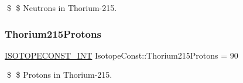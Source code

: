\$ \$ Neutrons in Thorium-\/215. \mbox{\label{group___isotope_const-_thorium-_th215_ga2a066ddfc7cb178f2996d503899d1e0f}} 
\subsubsection{\texorpdfstring{Thorium215\+Protons}{Thorium215Protons}}
{\footnotesize\ttfamily \mbox{\hyperlink{group___isotope_const-_macros_ga5f18360b3e99483a35c32d789e62621c}{I\+S\+O\+T\+O\+P\+E\+C\+O\+N\+S\+T\+\_\+\+I\+NT}} Isotope\+Const\+::\+Thorium215\+Protons = 90}

\$ \$ Protons in Thorium-\/215. 